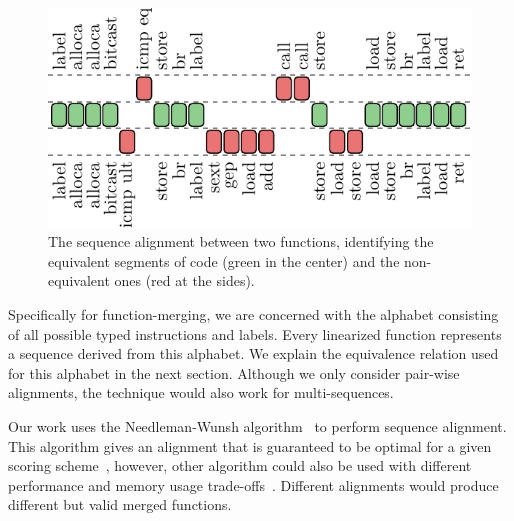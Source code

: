 \begin{figure}[t]
  \centering
  \includegraphics[width=0.75\linewidth]{figs/opcode-align.pdf}
  \caption{The sequence alignment between two functions, identifying the equivalent segments of code (green in the center) and the non-equivalent ones (red at the sides).}
  \label{fig:opcode-align}
\end{figure}

Specifically for function-merging, we are concerned with the alphabet
consisting of all possible typed instructions and labels.
Every linearized function represents a sequence derived from this alphabet.
We explain the equivalence relation used for this alphabet in the next section.
Although we only consider pair-wise alignments, the technique would also work
for multi-sequences.


Our work uses the Needleman-Wunsh algorithm~\cite{needleman70} to perform sequence alignment.
This algorithm gives an alignment that is guaranteed to be optimal for a given scoring scheme~\cite{higgins89},
however, other algorithm could also be used with different performance and memory usage trade-offs~\cite{needleman70,smith81,carrillo88,hickey11}.
Different alignments would produce different but valid merged functions.


